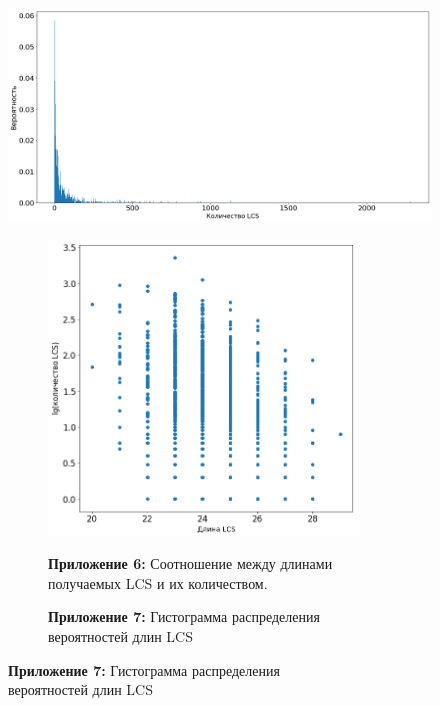 \documentclass[a4paper,12pt]{extarticle}
\begin{document}
\begin{figure}[h!]
  \caption*{\textbf{Приложение 5: }Гистограмма вероятностей количества LCS}
  \label{fig:1}
  \includegraphics[width=1\textwidth]{Diogram_1.png}
  \centering
  \begin{subfigure}{.5\textwidth}
    \vspace{1.5cm}
    \centering
    \captionsetup{justification=centering}
    \caption*{\textbf{Приложение 6: }Соотношение между длинами\\получаемых LCS и их количеством.}
    \includegraphics[width=0.9\textwidth]{Diogram_2.png}
    \label{fig:2}
  \end{subfigure}%
  \begin{subfigure}{.5\textwidth}
    \vspace{1.5cm}
    \centering
    \captionsetup{justification=centering}
    \caption*{\textbf{Приложение 7: }Гистограмма распределения\\вероятностей длин LCS}

\end{subfigure}
\end{figure}
\end{document}
